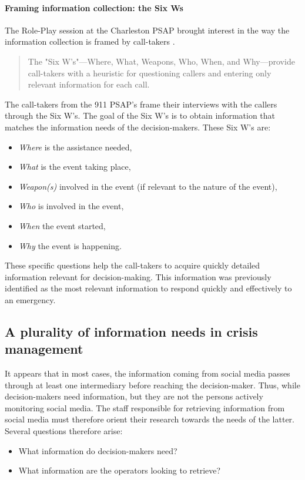 \paragraph{Framing information collection: the Six Ws}
\label{sec:sixws}
The Role-Play session at the Charleston PSAP brought interest in the way the information collection is framed by call-takers \parencite{kropczynskiIdentifyingActionableInformation2018}.
\blockquote{The "Six W's"—Where, What, Weapons, Who, When, and Why—provide call-takers with a heuristic for questioning callers and entering only relevant information for each call.}
The call-takers from the 911 PSAP's frame their interviews with the callers through the Six W's.
The goal of the Six W's is to obtain information that matches the information needs of the decision-makers.
These Six W's are:
\begin{itemize}
    \item \textit{Where} is the assistance needed,
    \item \textit{What} is the event taking place,
    \item \textit{Weapon(s)} involved in the event (if relevant to the nature of the event),
    \item \textit{Who} is involved in the event,
    \item \textit{When} the event started,
    \item \textit{Why} the event is happening.
\end{itemize}
These specific questions help the call-takers to acquire quickly detailed information relevant for decision-making.
This information was previously identified as the most relevant information to respond quickly and effectively to an emergency.

\subsection{A plurality of information needs in crisis management}
It appears that in most cases, the information coming from social media passes through at least one intermediary before reaching the decision-maker.
Thus, while decision-makers need information, but they are not the persons actively monitoring social media.
The staff responsible for retrieving information from social media must therefore orient their research towards the needs of the latter.
Several questions therefore arise:

\begin{itemize}
    \item What information do decision-makers need?
    \item What information are the operators looking to retrieve?
\end{itemize}

